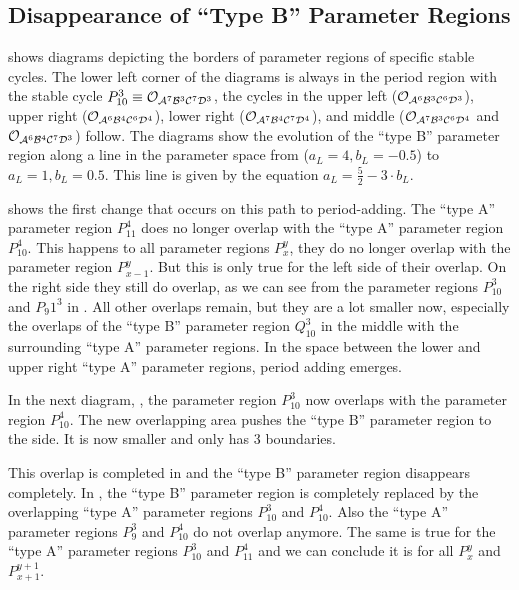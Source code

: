 \subsection{Disappearance of ``Type B'' Parameter Regions}
\label{sec:minrep.adding.disapp.typeB}

 shows diagrams depicting the borders of parameter regions of specific stable cycles.
The lower left corner of the diagrams is always in the period region with the stable cycle $P_{10}^3 \equiv \mathcal{O}_{\mathcal{A}^7\mathcal{B}^3\mathcal{C}^7\mathcal{D}^3}$, the cycles in the upper left ($\mathcal{O}_{\mathcal{A}^6\mathcal{B}^3\mathcal{C}^6\mathcal{D}^3}$), upper right ($\mathcal{O}_{\mathcal{A}^6\mathcal{B}^4\mathcal{C}^6\mathcal{D}^4}$), lower right ($\mathcal{O}_{\mathcal{A}^7\mathcal{B}^4\mathcal{C}^7\mathcal{D}^4}$), and middle ($\mathcal{O}_{\mathcal{A}^7\mathcal{B}^3\mathcal{C}^6\mathcal{D}^4}$ and $\mathcal{O}_{\mathcal{A}^6\mathcal{B}^4\mathcal{C}^7\mathcal{D}^3}$) follow.
The diagrams show the evolution of the ``type B'' parameter region along a line in the parameter space from  ($a_L = 4, b_L = -0.5$) to  $a_L = 1, b_L = 0.5$.
This line is given by the equation $a_L = \frac{5}{2} - 3 \cdot b_L$.

 shows the first change that occurs on this path to period-adding.
The ``type A'' parameter region $P_{11}^4$ does no longer overlap with the ``type A'' parameter region $P_{10}^4$.
This happens to all parameter regions $P_{x}^y$, they do no longer overlap with the parameter region $P_{x-1}^y$.
But this is only true for the left side of their overlap.
On the right side they still do overlap, as we can see from the parameter regions $P_{10}^3$ and $P_{9}1^3$ in .
All other overlaps remain, but they are a lot smaller now, especially the overlaps of the ``type B'' parameter region $Q_{10}^3$ in the middle with the surrounding ``type A'' parameter regions.
In the space between the lower and upper right ``type A'' parameter regions, period adding emerges.

In the next diagram, , the parameter region $P_{10}^3$ now overlaps with the parameter region $P_{10}^4$.
The new overlapping area pushes the ``type B'' parameter region to the side.
It is now smaller and only has 3 boundaries.

This overlap is completed in  and the ``type B'' parameter region disappears completely.
In , the ``type B'' parameter region is completely replaced by the overlapping ``type A'' parameter regions $P_{10}^3$ and $P_{10}^4$.
Also the ``type A'' parameter regions $P_9^3$ and $P_{10}^4$ do not overlap anymore.
The same is true for the ``type A'' parameter regions $P_{10}^3$ and $P_{11}^4$ and we can conclude it is for all $P_x^y$ and $P_{x+1}^{y+1}$.

